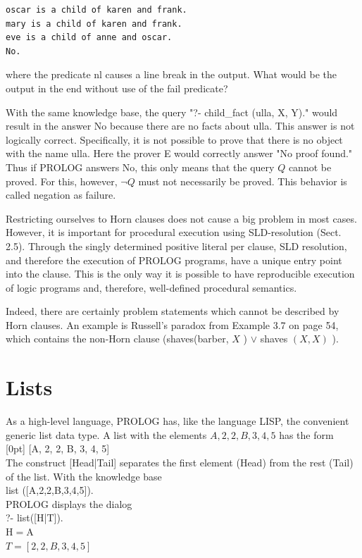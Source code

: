 \documentclass[10pt]{book}
\begin{document}
\begin{verbatim}
oscar is a child of karen and frank.
mary is a child of karen and frank.
eve is a child of anne and oscar.
No.
\end{verbatim}

where the predicate nl causes a line break in the output. What would be the output in the end without use of the fail predicate?

With the same knowledge base, the query "?- child\_fact (ulla, X, Y)." would result in the answer No because there are no facts about ulla. This answer is not logically correct. Specifically, it is not possible to prove that there is no object with the name ulla. Here the prover E would correctly answer "No proof found." Thus if PROLOG answers No, this only means that the query $Q$ cannot be proved. For this, however, $\neg Q$ must not necessarily be proved. This behavior is called negation as failure.

Restricting ourselves to Horn clauses does not cause a big problem in most cases. However, it is important for procedural execution using SLD-resolution (Sect. 2.5). Through the singly determined positive literal per clause, SLD resolution, and therefore the execution of PROLOG programs, have a unique entry point into the clause. This is the only way it is possible to have reproducible execution of logic programs and, therefore, well-defined procedural semantics.

Indeed, there are certainly problem statements which cannot be described by Horn clauses. An example is Russell's paradox from Example 3.7 on page 54, which contains the non-Horn clause (shaves(barber, $X$ ) $\vee$ shaves $(X, X)$ ).

\section{Lists}
As a high-level language, PROLOG has, like the language LISP, the convenient generic list data type. A list with the elements $A, 2,2, B, 3,4,5$ has the form\\
[0pt]
[A, 2, 2, B, 3, 4, 5]\\[0pt]
The construct [Head|Tail] separates the first element (Head) from the rest (Tail) of the list. With the knowledge base\\[0pt]
list ([A,2,2,B,3,4,5]).\\
PROLOG displays the dialog\\[0pt]
?- list([H|T]).\\
$\mathrm{H}=\mathrm{A}$\\
$T=[2,2, B, 3,4,5]$
\end{document}
